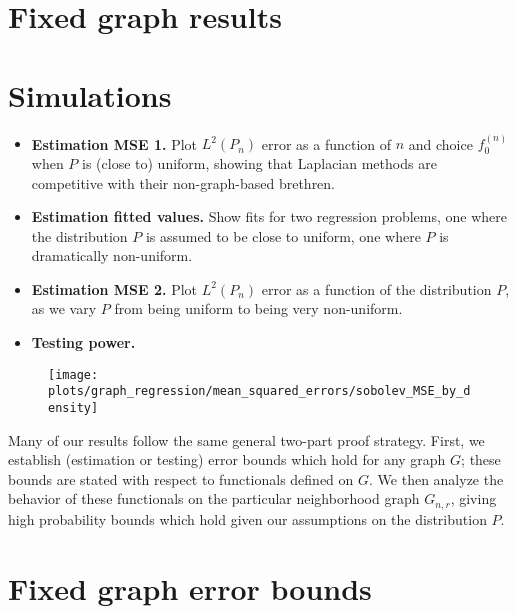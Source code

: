 \documentclass{article}
\newcommand{\1}{\mathbf{1}}
\theoremstyle{alden}
\theoremstyle{aldenthm}
\theoremstyle{definition}
\theoremstyle{remark}
\begin{document}
\section{Fixed graph results}

\section{Simulations}
\begin{itemize}
	\item \textbf{Estimation MSE 1.} Plot $L^2(P_n)$ error as a function of $n$ and choice $f_0^{(n)}$ when $P$ is (close to) uniform, showing that Laplacian methods are competitive with their non-graph-based brethren.
	\item \textbf{Estimation fitted values.} Show fits for two regression problems, one where the distribution $P$ is assumed to be close to uniform, one where $P$ is dramatically non-uniform.
	\item \textbf{Estimation MSE 2.} Plot $L^2(P_n)$ error as a function of the distribution $P$, as we vary $P$ from being uniform to being very non-uniform.
	 
	\item \textbf{Testing power.} 
\end{itemize}

\begin{figure}
	\centering
	\texttt{[image: plots/graph\_regression/mean\_squared\_errors/sobolev\_MSE\_by\_density]}
	\caption{}
	\label{fig:piecewise_cosine}
\end{figure}

\clearpage

\appendix

Many of our results follow the same general two-part proof strategy. First, we establish (estimation or testing) error bounds which hold for any graph $G$; these bounds are stated with respect to functionals defined on $G$. We then analyze the behavior of these functionals on the particular neighborhood graph $G_{n,r}$, giving high probability bounds which hold given our assumptions on the distribution $P$. 

\section{Fixed graph error bounds}
\end{document}
